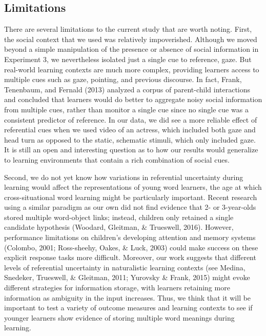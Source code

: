 \documentclass[authoryear, review]{elsarticle}
\begin{document}
\subsection{Limitations}\label{limitations}

There are several limitations to the current study that are worth
noting. First, the social context that we used was relatively
impoverished. Although we moved beyond a simple manipulation of the
presence or absence of social information in Experiment 3, we
nevertheless isolated just a single cue to reference, gaze. But
real-world learning contexts are much more complex, providing learners
access to multiple cues such as gaze, pointing, and previous discourse.
In fact, Frank, Tenenbaum, and Fernald (2013) analyzed a corpus of
parent-child interactions and concluded that learners would do better to
aggregate noisy social information from multiple cues, rather than
monitor a single cue since no single cue was a consistent predictor of
reference. In our data, we did see a more reliable effect of referential
cues when we used video of an actress, which included both gaze and head
turn as opposed to the static, schematic stimuli, which only included
gaze. It is still an open and interesting question as to how our results
would generalize to learning environments that contain a rich
combination of social cues.

Second, we do not yet know how variations in referential uncertainty
during learning would affect the representations of young word learners,
the age at which cross-situational word learning might be particularly
important. Recent research using a similar paradigm as our own did not
find evidence that 2- or 3-year-olds stored multiple word-object links;
instead, children only retained a single candidate hypothesis (Woodard,
Gleitman, \& Trueswell, 2016). However, performance limitations on
children's developing attention and memory systems (Colombo, 2001;
Ross-sheehy, Oakes, \& Luck, 2003) could make success on these explicit
response tasks more difficult. Moreover, our work suggests that
different levels of referential uncertainty in naturalistic learning
contexts (see Medina, Snedeker, Trueswell, \& Gleitman, 2011; Yurovsky
\& Frank, 2015) might evoke different strategies for information
storage, with learners retaining more information as ambiguity in the
input increases. Thus, we think that it will be important to test a
variety of outcome measures and learning contexts to see if younger
learners show evidence of storing multiple word meanings during
learning.
\end{document}

